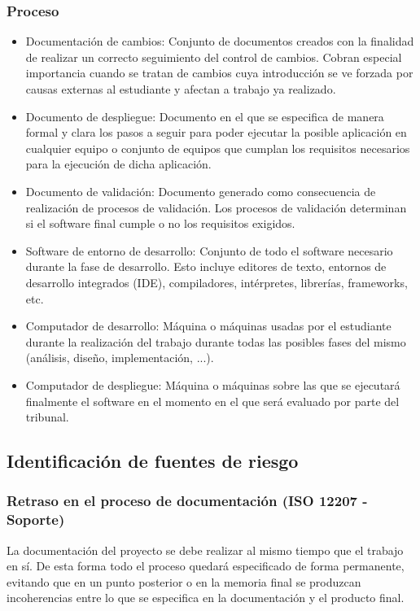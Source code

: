 \documentclass[10pt,a4paper]{article}
\begin{document}
			\subsubsection{Proceso}
			\begin{itemize}
			    \item Documentación de cambios: Conjunto de documentos creados con la finalidad de realizar un correcto seguimiento del control de cambios. Cobran especial importancia cuando se tratan de cambios cuya introducción se ve forzada por causas externas al estudiante y afectan a trabajo ya realizado.
			    \item Documento de despliegue: Documento en el que se especifica de manera formal y clara los pasos a seguir para poder ejecutar la posible aplicación en cualquier equipo o conjunto de equipos que cumplan los requisitos necesarios para la ejecución de dicha aplicación.
			    \item Documento de validación: Documento generado como consecuencia de realización de procesos de validación. Los procesos de validación determinan si el software final cumple o no los requisitos exigidos.
			    \item Software de entorno de desarrollo: Conjunto de todo el software necesario durante la fase de desarrollo. Esto incluye editores de texto, entornos de desarrollo integrados (IDE), compiladores, intérpretes, librerías, frameworks, etc.
                \item Computador de desarrollo: Máquina o máquinas usadas por el estudiante durante la realización del trabajo durante todas las posibles fases del mismo (análisis, diseño, implementación, ...).	    
			    \item Computador de despliegue: Máquina o máquinas sobre las que se ejecutará finalmente el software en el momento en el que será evaluado por parte del tribunal.
			\end{itemize}
		\subsection{Identificación de fuentes de riesgo}
			\subsubsection{Retraso en el proceso de documentación (ISO 12207 - Soporte)}
			La documentación del proyecto se debe realizar al mismo tiempo que el trabajo en sí. De esta forma todo el proceso quedará especificado de forma permanente, evitando que en un punto posterior o en la memoria final se produzcan incoherencias entre lo que se especifica en la documentación y el producto final.
\end{document}
